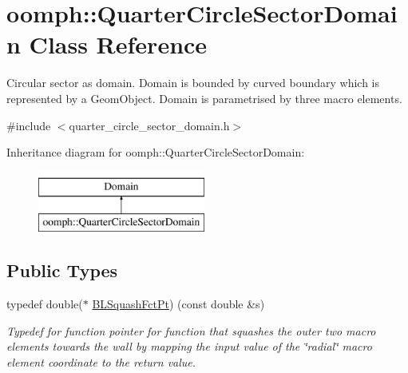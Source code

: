 \hypertarget{classoomph_1_1QuarterCircleSectorDomain}{}\section{oomph\+:\+:Quarter\+Circle\+Sector\+Domain Class Reference}
\label{classoomph_1_1QuarterCircleSectorDomain}


Circular sector as domain. Domain is bounded by curved boundary which is represented by a Geom\+Object. Domain is parametrised by three macro elements.  




{\ttfamily \#include $<$quarter\+\_\+circle\+\_\+sector\+\_\+domain.\+h$>$}

Inheritance diagram for oomph\+:\+:Quarter\+Circle\+Sector\+Domain\+:\begin{figure}[H]
\begin{center}
\leavevmode
\includegraphics[height=2.000000cm]{classoomph_1_1QuarterCircleSectorDomain}
\end{center}
\end{figure}
\subsection*{Public Types}
\begin{DoxyCompactItemize}
\item 
typedef double($\ast$ \hyperlink{classoomph_1_1QuarterCircleSectorDomain_a6cffab57f87c9f4ab01744647240bb1e}{B\+L\+Squash\+Fct\+Pt}) (const double \&s)
\begin{DoxyCompactList}\small\item\em Typedef for function pointer for function that squashes the outer two macro elements towards the wall by mapping the input value of the \char`\"{}radial\char`\"{} macro element coordinate to the return value. \end{DoxyCompactList}\end{DoxyCompactItemize}
